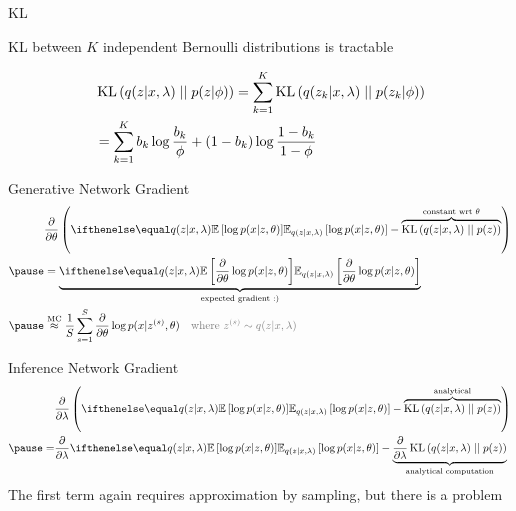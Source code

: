 \begin{frame}{KL}

KL between $K$ independent Bernoulli distributions is tractable

\begin{equation*}
\begin{aligned}
	&\operatorname{KL}\left(q(z|x, \lambda)\mid\mid p(z|\phi)\right)  = \sum_{k=1}^K \operatorname{KL}\left(q(z_k|x, \lambda)\mid\mid p(z_k|\phi)\right) \\
	&=  \sum_{k=1}^K b_k \log \frac{b_k}{\phi} + (1 - b_k) \log \frac{1 - b_k}{1 - \phi}
\end{aligned}
\end{equation*}

\end{frame}

\begin{frame}{Generative Network Gradient}
\begin{equation*}
\begin{aligned}
&\pdv{\theta} \left( \E[q(z|x,\lambda)]{\log p(x|z,\theta)} - \overbrace{\KL{q(z|x,\lambda)}{p(z)}}^{\text{constant wrt }\theta} \right) \\ \pause 
&=\underbrace{\E[q(z|x,\lambda)]{\pdv{\theta}\log p(x|z,\theta)}}_{\text{expected gradient :)}} \\ \pause
&\overset{\text{MC}}{\approx} \frac{1}{S}\sum_{s=1}^{S}
\pdv{\theta} \log p(x|z^{(s)},\theta) \quad \textcolor{gray}{\text{where } z^{(s)} \sim q(z|x,\lambda)}
\end{aligned}
\end{equation*}

\end{frame}

\begin{frame}{Inference Network Gradient}
\begin{equation*}
\begin{aligned}
&\pdv{\lambda}\left(\E[q(z|x,\lambda)]{\log p(x|z,\theta)} - \overbrace{\KL{q(z|x,\lambda)}{p(z)}}^{\text{analytical}} \right) \\ \pause
=&\pdv{\lambda}\E[q(z|x,\lambda)]{\log p(x|z,\theta)} - \underbrace{\pdv{\lambda}\KL{q(z|x,\lambda)}{p(z)}}_{\text{analytical computation}} \\
\end{aligned}
\end{equation*}
\pause
The first term again requires approximation by sampling,  but there is a problem

\end{frame}

